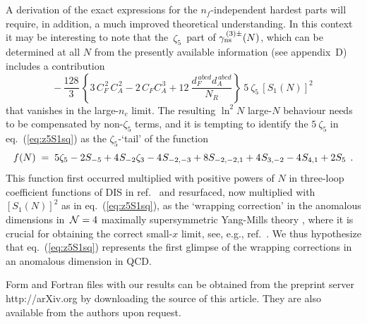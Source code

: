 \documentclass[12pt]{article}
\newcommand{\beq}{\begin{equation}}
\newcommand{\eeq}{\end{equation}}
\def\nc{{n_c}}
\def\cas{{C^{\,2}_A}}
\def\cat{{C^{\,3}_A}}
\def\cf{{C^{}_F}}
\def\cfs{{C^{\, 2}_F}}
\def\nf{{n^{}_{\! f}}}
\def\dfFAnc{{\frac{d_F^{\,abcd}d_A^{\,abcd}}{N_R }}}
\def\S(#1){{{S}_{#1}}}
\def\Ss(#1,#2){{{S}_{#1,#2}}}
\def\Sss(#1,#2,#3){{{S}_{#1,#2,#3}}}
\begin{document}
A derivation of the exact expressions for the $\nf$-independent hardest 
parts will require, in addition, a much improved theoretical understanding.
In this context it may be interesting to note that the $\,\zeta_5\,$ part of
$\gamma_{\rm ns}^{\,(3)\pm}(N)$, which can be determined at all $N$ from the
presently available information (see appendix~D) 
includes a contribution
%
\beq
\label{eq:z5S1sq}
  -\,\frac{128}{3}\,\left\{ 3\,\cfs\,\cas - 2\,\cf\cat + 12\:\dfFAnc \right\}
   \:5\:\!\zeta_5^{}\, [S_1(N)]^2
\eeq
%
that vanishes in the large-$\nc$ limit.
The resulting $\ln^2 N$ large-$N$ behaviour needs to be compensated by 
non-$\zeta_5$ terms, and it is tempting to identify the $5\:\!\zeta_5$ in 
eq.~(\ref{eq:z5S1sq}) as the $\zeta_5$-`tail' of the function
%
\beq
     f(N) \;=\;
        5 \* \zeta_5
       - 2 \* \S(-5)
       + 4 \:\!\* \S(-2) \* \zeta_3
       - 4 \:\!\* \Ss(-2,-3)
       + 8 \* \Sss(-2,-2,1)
       + 4 \:\!\* \Ss(3,-2)
       - 4 \:\!\* \Ss(4,1)
       + 2 \* \S(5)
\:\: . 
\eeq 
%
This function first occurred multiplied with positive powers of $N$ in 
three-loop coefficient functions of DIS in ref.~\cite{Vermaseren:2005qc} and 
resurfaced, now multiplied with $[S_1(N)]^2$ as in eq.~(\ref{eq:z5S1sq}), as 
the `wrapping correction' in the anomalous dimensions in $\,{\cal N}=4$ 
maximally supersymmetric Yang-Mills theory \cite{Bajnok:2008qj}, where it is
crucial for obtaining the correct small-$x$ limit, see, e.g., 
ref.~\cite{Kotikov:2007cy}.
We thus hypothesize that eq.~(\ref{eq:z5S1sq}) represents the first glimpse 
of the wrapping corrections in an anomalous dimension in QCD.

\bigskip
\medskip


\noindent
{\sc Form} and {\sc Fortran} files with our results can be obtained from 
the preprint server http://arXiv.org by downloading the source of this article.
They are also available from the authors 
upon request.

\newpage

%
\end{document}
